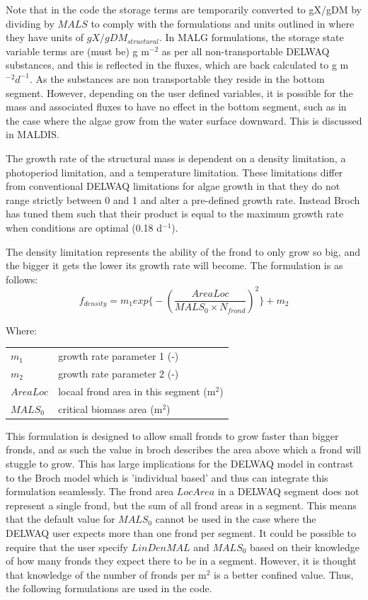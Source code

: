 \documentclass{deltares_manual}
\begin{document}
Note that in the code the storage terms are temporarily converted to gX/gDM by dividing by $MALS$ to comply with the formulations and units outlined in \cite{broch2012} where they have units of $gX/gDM_{structural}$. In MALG formulations, the storage state variable terms are (must be) g m$^{-2}$ as per all non-transportable DELWAQ substances, and this is reflected in the fluxes, which are back calculated to g m$^{-2}d^{-1}$. As the substances are non transportable they reside in the bottom segment. However, depending on the user defined variables, it is possible for the mass and associated fluxes to have no effect in the bottom segment, such as in the case where the algae grow from the water surface downward. This is discussed in MALDIS.

The growth rate of the structural mass is dependent on a density limitation, a photoperiod limitation, and a temperature limitation. These limitations differ from conventional DELWAQ limitations for algae growth in that they do not range strictly between 0 and 1 and alter a pre-defined growth rate. Instead Broch has tuned them such that their product is equal to the maximum growth rate when conditions are optimal (0.18 d$^{-1}$). 

The density limitation represents the ability of the frond to only grow so big, and the bigger it gets the lower its growth rate will become. The formulation is as follows:
\begin{equation}
f_{density} = m_1 exp\big\{-(\frac{AreaLoc}{MALS_0\times N_{frond}})^2 \big\}+m_2
\end{equation}

Where:\\

\begin{tabular}{ll}
	$m_1$    & growth rate parameter 1 (-)\\
	$m_2$    & growth rate parameter 2 (-)\\
	$AreaLoc$ & locaal frond area in this segment (m$^2$)\\
	$MALS_0$ & critical biomass area (m$^2$)\\
\end{tabular}

This formulation is designed to allow small fronds to grow faster than bigger fronds, and as such the value in broch describes the area above which a frond will stuggle to grow. This has large implications for the DELWAQ model in contrast to the Broch model which is 'individual based' and thus can integrate this formulation seamlessly. The frond area $LocArea$ in a DELWAQ segment does not represent a single frond, but the sum of all frond areas in a segment. This means that the default value for $MALS_{0}$ cannot be used in the case where the DELWAQ user expects more than one frond per segment. It could be possible to require that the user specify $LinDenMAL$ and $MALS_{0}$ based on their knowledge of how many fronds they expect there to be in a segment. However, it is thought that knowledge of the number of fronds per m$^{2}$ is a better confined value. Thus, the following formulations are used in the code.
 
\end{document}
